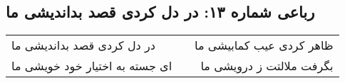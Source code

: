 \begin{center}
\section*{رباعی شماره ۱۳: در دل کردی قصد بداندیشی ما}
\label{sec:sh013}
\begin{longtable}{l p{0.5cm} r}
در دل کردی قصد بداندیشی ما
&&
ظاهر کردی عیب کمابیشی ما
\\
ای جسته به اختیار خود خویشی ما
&&
بگرفت ملالتت ز درویشی ما
\\
\end{longtable}
\end{center}
